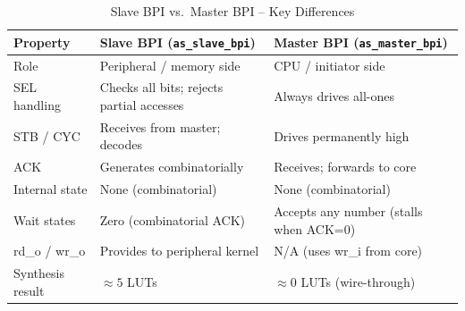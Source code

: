 \begin{table}[H]
\caption{Slave BPI vs.\ Master BPI -- Key Differences}
\label{tab:asBpiCompare}
\centering
\begin{tabularx}{\textwidth}{|l |X |X|}
  \hline
  Property & Slave BPI (\texttt{as\_slave\_bpi}) & Master BPI (\texttt{as\_master\_bpi}) \\
  \hline
  \hline
  Role              & Peripheral / memory side & CPU / initiator side \\
  \hline
  SEL handling      & Checks all bits; rejects partial accesses & Always drives all-ones \\
  \hline
  STB / CYC         & Receives from master; decodes & Drives permanently high \\
  \hline
  ACK               & Generates combinatorially & Receives; forwards to core \\
  \hline
  Internal state    & None (combinatorial) & None (combinatorial) \\
  \hline
  Wait states       & Zero (combinatorial ACK) & Accepts any number (stalls when ACK=0) \\
  \hline
  rd\_o / wr\_o     & Provides to peripheral kernel & N/A (uses wr\_i from core) \\
  \hline
  Synthesis result  & $\approx 5$ LUTs & $\approx 0$ LUTs (wire-through) \\
  \hline
\end{tabularx}
\end{table}
